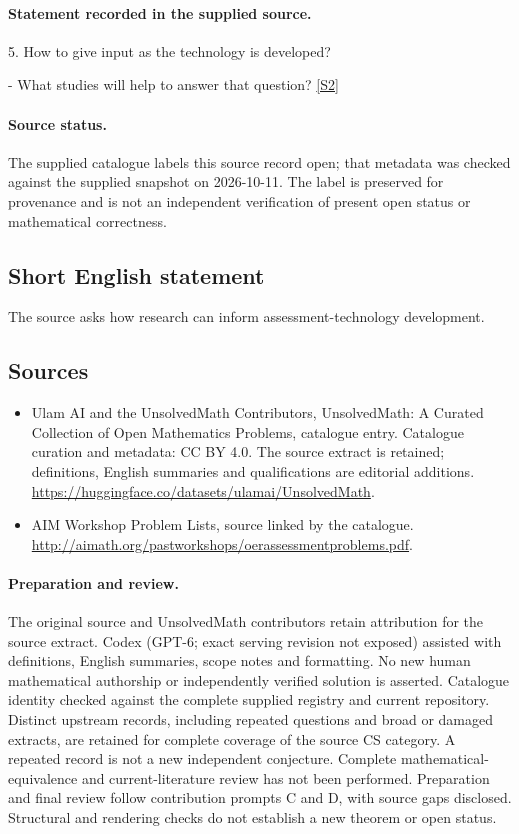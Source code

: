 \documentclass[11pt]{article}
\begin{document}
\paragraph{Statement recorded in the supplied source.}
5. How to give input as the technology is developed?

- What studies will help to answer that question? \href{http://aimath.org/pastworkshops/oerassessmentproblems.pdf}{[S2]}
\paragraph{Source status.}
The supplied catalogue labels this source record open; that metadata was checked against the supplied snapshot on 2026-10-11. The label is preserved for provenance and is not an independent verification of present open status or mathematical correctness.
\subsection{Short English statement}
The source asks how research can inform assessment-technology development.
\subsection{Sources}
\begin{itemize}
\item[S1] Ulam AI and the UnsolvedMath Contributors, UnsolvedMath: A Curated Collection of Open Mathematics Problems, catalogue entry. Catalogue curation and metadata: CC BY 4.0. The source extract is retained; definitions, English summaries and qualifications are editorial additions.
\url{https://huggingface.co/datasets/ulamai/UnsolvedMath}.
\item[S2] AIM Workshop Problem Lists, source linked by the catalogue.
\url{http://aimath.org/pastworkshops/oerassessmentproblems.pdf}.
\end{itemize}
\paragraph{Preparation and review.}
The original source and UnsolvedMath contributors retain attribution for the source extract. Codex (GPT-6; exact serving revision not exposed) assisted with definitions, English summaries, scope notes and formatting. No new human mathematical authorship or independently verified solution is asserted. Catalogue identity checked against the complete supplied registry and current repository. Distinct upstream records, including repeated questions and broad or damaged extracts, are retained for complete coverage of the source CS category. A repeated record is not a new independent conjecture. Complete mathematical-equivalence and current-literature review has not been performed. Preparation and final review follow contribution prompts C and D, with source gaps disclosed. Structural and rendering checks do not establish a new theorem or open status.
\label{end:statement}
\end{document}
